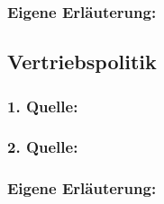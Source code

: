         \subsubsection*{Eigene Erläuterung:}
        \begin{abstract}
        \end{abstract}
    \subsection{Vertriebspolitik}
        \subsubsection*{1. Quelle:}
        \begin{abstract}
        \end{abstract}
        \subsubsection*{2. Quelle:}
        \begin{abstract}
        \end{abstract}
        \subsubsection*{Eigene Erläuterung:}
        \begin{abstract}
        \end{abstract}
    